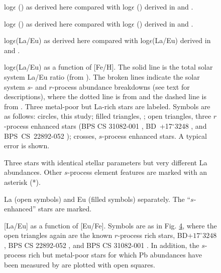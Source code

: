 \documentclass[12pt,preprint]{aastex}
\def\deg{{$^{\circ}$}}
\def\bd17{\mbox{BD +17\deg 3248}}
\def\cs22{\mbox{BPS CS 22892-052}}
\begin{document}
{%
\begin{figure}
\caption{log$\epsilon$ ()  as derived here compared with log$\epsilon$ () derived in \citet{Burris2000} and \citet{Johnson2002}.  
\label{comp1}}
\end{figure}

\begin{figure}
\caption{log$\epsilon$ ()  as derived here compared with log$\epsilon$ ()  derived in \citet{Burris2000} and \citet{Johnson2002}.
\label{comp2}}
\end{figure}

\begin{figure}
\caption{log$\epsilon$(La/Eu) as derived here  compared with log$\epsilon$(La/Eu) derived in \citet{Burris2000} and \citet{Johnson2002}.
\label{comp3}}
\end{figure}

\begin{figure}
\caption{log$\epsilon$(La/Eu) as a function of [Fe/H].   The solid line is the total solar system La/Eu ratio (from \citealt{Lodders2003}).  The broken lines indicate the solar system $s$- and $r$-process abundance breakdowns (see text for descriptions), where the dotted line is from \citet{Burris2000} and the dashed line is from \citet{Arlandini1999}.  Three metal-poor but La-rich stars are labeled.  
Symbols are as follows: circles, this study; filled triangles, \citet{Woolf1995}; open 
triangles, three $r$-process enhanced stars (BPS CS 31082-001 \citealt{Hill2002}, \bd17  \citealt{BD17}, and \cs22 \citealt{CS22892}); crosses, $s$-process enhanced stars.  A typical error is shown.
\label{feh}}
\end{figure}

\begin{figure}
\caption{Three stars with identical stellar parameters but very different La abundances.  Other $s$-process element features are marked with an asterisk (*).
\label{trio}}
\end{figure}

\begin{figure}
\caption{La (open symbols)  and Eu (filled symbols) separately.  The ``$s$-enhanced'' stars are marked.
\label{logeps}}
\end{figure}

\begin{figure}
\caption{[La/Eu] as a function of [Eu/Fe].  Symbols are as in Fig. \ref{feh}, where the open triangles again are the known $r$-process rich stars, BD$+17^{\circ} 3248$ \citep{BD17}, BPS CS 22892-052 \citep{CS22892}, and BPS CS 31082-001 \citep{Hill2002}.  In addition, the $s$-process rich but metal-poor stars for which Pb abundances have been measured by \citet{Aoki2002} are plotted with open squares.
\label{flin}}
\end{figure}

}
\end{document}
